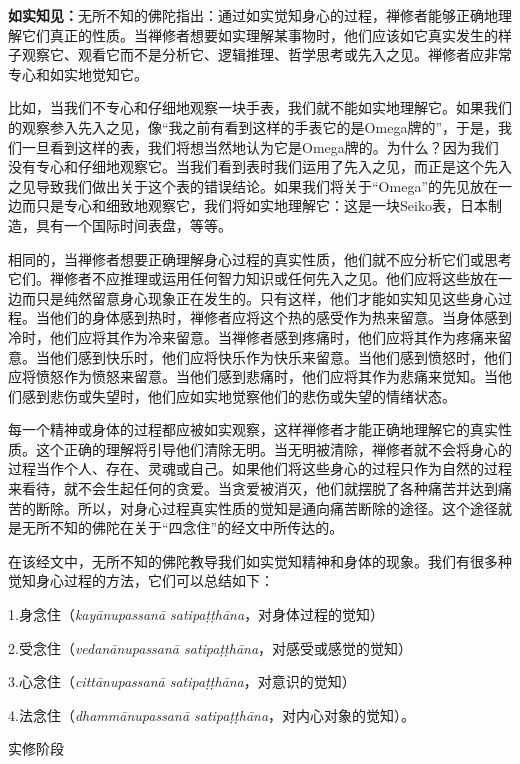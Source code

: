 {\bf 如实知见：}无所不知的佛陀指出：通过如实觉知身心的过程，禅修者能够正确地理解它们真正的性质。当禅修者想要如实理解某事物时，他们应该如它真实发生的样子观察它、观看它而不是分析它、逻辑推理、哲学思考或先入之见。禅修者应非常专心和如实地觉知它。

比如，当我们不专心和仔细地观察一块手表，我们就不能如实地理解它。如果我们的观察参入先入\1之见，像“我之前有看到这样的手表它的是Omega牌的”，于是，我们一旦看到这样的表，我们将想当然地认为它是Omega牌的。为什么？因为我们没有专心和仔细地观察它。当我们看到表时我们运用了先入之见，而正是这个先入之见导致我们做出关于这个表的错误结论。如果我们将关于“Omega”的先见放在一边而只是专心和细致地观察它，我们将如实地理解它：这是一块Seiko表，日本制造，具有一个国际时间表盘，等等。

相同的，当禅修者想要正确理解身心过程的真实性质，他们就不应分析它们或思考它们。禅修者不应推理或运用任何智力知识或任何先入之见。他们应将这些放在一边而只是纯然留意身心现象正在发生的。只有这样，他们才能如实知见这些身心过程。当他们的身体感到热时，禅修者应将这个热的感受作为热来留意。当身体感到冷时，他们应将其作为冷来留意。当禅修者感到疼痛时，他们应将其作为疼痛来留意。当他们感到快乐时，他们应将快乐作为快乐来留意。当他们感到愤怒时，他们应将愤怒作为愤怒来留意。当他们感到悲痛时，他们应将其作为悲痛来觉知。当他们感到悲伤或失望时，他们应如实地觉察他们的悲伤或失望的情绪状态。

每一个精神或身体的过程都应被如实观察，这样禅修者才能正确地理解它的真实性质。这个正确的理解将引导他们清除无明。当无明被清除，禅修者就不会将身心的过程当作个人、存在、灵魂或自己。如果\1他们将这些身心的过程只作为自然的过程来看待，就不会生起任何的贪爱。当贪爱被消灭，他们就摆脱了各种痛苦并达到痛苦的断除。所以，对身心过程真实性质的觉知是通向痛苦断除的途径。这个途径就是无所不知的佛陀在关于“四念住”的经文中所传达的。

在该经文中，无所不知的佛陀教导我们如实觉知精神和身体的现象。我们有很多种觉知身心过程的方法，它们可以总结如下：

{
\leftskip=1.6pc
\item{1.}身念住（{\it kay\=anupassan\=a satipa\d t\d th\=ana}，对身体过程的觉知）
\item{2.}受念住（{\it vedan\=anupassan\=a satipa\d t\d th\=ana}，对感受或感觉的觉知）
\item{3.}心念住（{\it citt\=anupassan\=a satipa\d t\d th\=ana}，对意识的觉知）
\item{4.}法念住（{\it dhamm\=anupassan\=a satipa\d t\d th\=ana}，对内心对象的觉知）。

}

\sssubsectnoni 实修阶段

